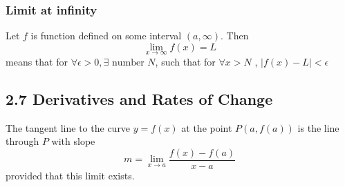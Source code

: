 \documentclass{article}
\begin{document}
\subsubsection*{Limit at infinity}
Let \(f\) is function defined on some interval  \( (a, \infty ) \). Then 
\[
\lim_{x \to \infty} f(x) = L
\]
means that for \( \forall \epsilon > 0 , \exists \text{ number } N \), such that 
for \( \forall x > N \) , \( |f(x) - L| < \epsilon \)

\subsection*{2.7 Derivatives and Rates of Change}
The tangent line to the curve \(y=f(x)\) at the point \(P(a,f(a))\) is the line through \(P\) with slope 
\[
m = \lim_{x \to a} \frac{f(x)-f(a)}{x-a}
\]
provided that this limit exists.
\end{document}
